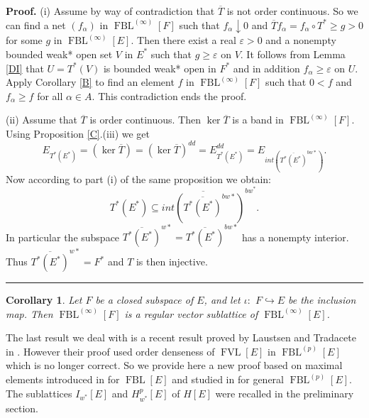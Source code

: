 \documentclass[12pt]{article}%
\newtheorem{corollary}[theorem]{Corollary}
\newenvironment{proof}[1][Proof]{\noindent\textbf{#1.} }{\ \rule{0.5em}{0.5em}}
\begin{document}
\begin{proof}
(i) Assume by way of contradiction that $\overline{T}$ is not order
continuous. So we can find a net $\left(  f_{\alpha}\right)  $ in
$\operatorname*{FBL}\nolimits^{(\infty)}[F]$ such that $f_{\alpha}\downarrow0$
and $\overline{T}f_{\alpha}=f_{\alpha}\circ T^{\ast}\geq g>0$ for some $g$ in
$\operatorname*{FBL}\nolimits^{(\infty)}[E].$ Then there exist a real
$\varepsilon>0$ and a nonempty bounded weak* open set $V$ in $E^{\ast}$ such
that $g\geq\varepsilon$ on $V.$ It follows from Lemma \ref{DI} that
$U=T^{\ast}\left(  V\right)  $ is bounded weak* open in $F^{\ast}$ and in
addition $f_{\alpha}\geq\varepsilon$ on $U.$ Apply Corollary \ref{B} to find
an element $f$ in $\operatorname*{FBL}\nolimits^{(\infty)}[F]$ such that $0<f$
and $f_{\alpha}\geq f$ for all $\alpha\in A.$ This contradiction ends the proof.

(ii) Assume that $\overline{T}$ is order continuous. Then $\ker\overline{T}$
is a band in $\operatorname*{FBL}\nolimits^{(\infty)}[F].$ Using Proposition
\ref{C}.(iii) we get
\[
E_{T^{\ast}\left(  E^{\ast}\right)  }=\left(  \ker\overline{T}\right)
=\left(  \ker\overline{T}\right)  ^{dd}=E_{T^{\ast}\left(  E^{\ast}\right)
}^{dd}=E_{int\left(  \overline{T^{\ast}\left(  E^{\ast}\right)  }^{bw\ast
}\right)  }.
\]
Now according to part (i) of the same proposition we obtain:
\[
T^{\ast}\left(  E^{\ast}\right)  \subseteq\overline{int\left(  \overline
{T^{\ast}\left(  E^{\ast}\right)  }^{bw\ast}\right)  }^{bw^{\ast}}.
\]
In particular the subspace $\overline{T^{\ast}\left(  E^{\ast}\right)
}^{w\ast}=\overline{T^{\ast}\left(  E^{\ast}\right)  }^{bw\ast}$ has a
nonempty interior. Thus $\overline{T^{\ast}\left(  E^{\ast}\right)  }^{w\ast
}=F^{\ast}$ and $T$ is then injective.
\end{proof}

\begin{corollary}
\textit{Let} $F$ \textit{be a closed subspace of} $E$, \textit{and let}
$\iota:$ $F\hookrightarrow E$ \textit{be the inclusion map. Then}
$\operatorname*{FBL}\nolimits^{(\infty)}[F]$ \textit{is a regular} vector
\textit{sublattice of} $\operatorname*{FBL}\nolimits^{(\infty)}[E]$.
\end{corollary}

The last result we deal with is a recent result proved by Laustsen and
Tradacete in \cite{L-968}. However their proof used order denseness of
$\operatorname*{FVL}\left[  E\right]  $ in $\operatorname*{FBL}\nolimits^{(p)}%
\left[  E\right]  $ which is no longer correct. So we provide here a new proof
based on maximal elements introduced in \cite{L-403} for $\operatorname*{FBL}%
\left[  E\right]  $ and studied in \cite{L-979} for general
$\operatorname*{FBL}\nolimits^{(p)}\left[  E\right]  $. The sublattices
$I_{w^{\ast}}\left[  E\right]  $ and $H_{w^{\ast}}^{p}\left[  E\right]  $ of
$H\left[  E\right]  $ were recalled in the preliminary section.
\end{document}
